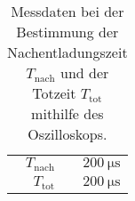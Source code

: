 \begin{table}[!h]
\begin{center}
\begin{tabular}{|r|r|}
\hline
$T_\mathrm{nach}$ & $\SI{200}{\micro\second}$ \\
$T_\mathrm{tot}$ & $\SI{200}{\micro\second}$
\hline
\end{tabular}
\caption[Aufbabe b,c]{Messdaten bei der Bestimmung der Nachentladungszeit $T_\mathrm{nach}$ und der Totzeit $T_\mathrm{tot}$ mithilfe des Oszilloskops.}
\label{tabelleb}
\end{center}
\end{table}